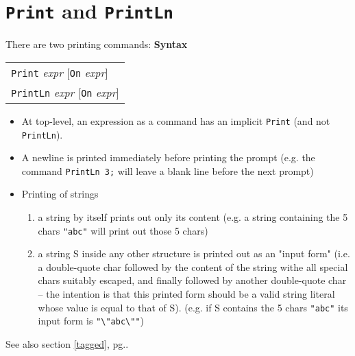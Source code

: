 \documentclass{book}[12,a4paper]
\def\refandpage#1{{\ref{#1}, pg.\pageref{#1}}}
\newenvironment{syntax}
{\goodbreak\noindent\textbf{Syntax}\\
 \begin{tabular}{|p{0.9\textwidth}|}\hline}
{\\\hline\end{tabular}}
\begin{document}
\section{\texttt{Print} and \texttt{PrintLn}}

There are two printing commands:
\begin{syntax}
\texttt{Print} \textit{expr} [\texttt{On} \textit{expr}]\\
\texttt{PrintLn} \textit{expr} [\texttt{On} \textit{expr}]
\end{syntax}

\begin{itemize}
\item At top-level, an expression as a command has an implicit \texttt{Print}
  (and not \texttt{PrintLn}).

\item A newline is printed immediately before printing the prompt
    (e.g. the command \texttt{PrintLn 3;} will leave a blank line before
     the next prompt)

\item Printing of strings
  \begin{enumerate}
  \item a string by itself prints out only its content (e.g. a string
    containing the 5 chars \verb|"abc"| will print out those 5 chars)
  \item a string S inside any other structure is printed out as an
    "input form" (i.e. a double-quote char followed by the content of
    the string withe all special chars suitably escaped, and finally
    followed by another double-quote char -- the intention is that
    this printed form should be a valid string literal whose value is
    equal to that of S).  (e.g. if S contains the 5 chars \verb|"abc"|
    its input form is \verb|"\"abc\""|)
  \end{enumerate}
\end{itemize}



See also section {\refandpage{tagged}}.
\end{document}
